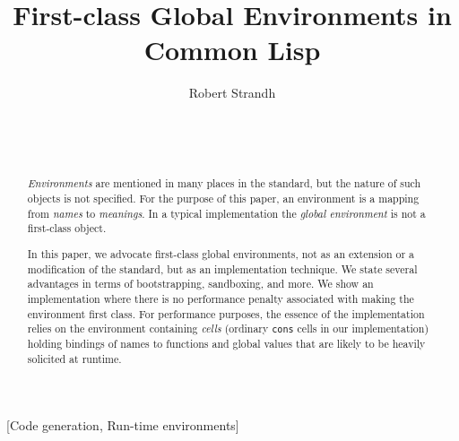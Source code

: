 \documentclass{acm_proc_article-sp}
\def\inputtex#1{}
\begin{document}
\title{First-class Global Environments in Common Lisp}
\author{\alignauthor
Robert Strandh\\
\\
\\
\\
}


\maketitle

\begin{abstract}
\emph{Environments} are mentioned in many places in
the \commonlisp{} standard, but the nature of such objects is not
specified.  For the purpose of this paper, an environment is a mapping
from \emph{names} to \emph{meanings}.  In a typical \commonlisp{}
implementation the \emph{global environment} is not a first-class
object.

In this paper, we advocate first-class global environments,
not as an extension or a modification of the \commonlisp{} standard,
but as an implementation technique.  We state several advantages in
terms of bootstrapping, sandboxing, and more.  We show an
implementation where there is no performance penalty associated with
making the environment first class.  For performance purposes, the
essence of the implementation relies on the environment containing
\emph{cells} (ordinary \texttt{cons} cells in our implementation)
holding bindings of names to functions and global values that are
likely to be heavily solicited at runtime.
\end{abstract}

[Code generation, Run-time environments]



\inputtex{spec-macros.tex}

\inputtex{sec-introduction.tex}
\inputtex{sec-previous.tex}
\inputtex{sec-our-method.tex}
\inputtex{sec-benefits.tex}
\inputtex{sec-conclusions.tex}
\inputtex{app-protocol.tex}



\end{document}
